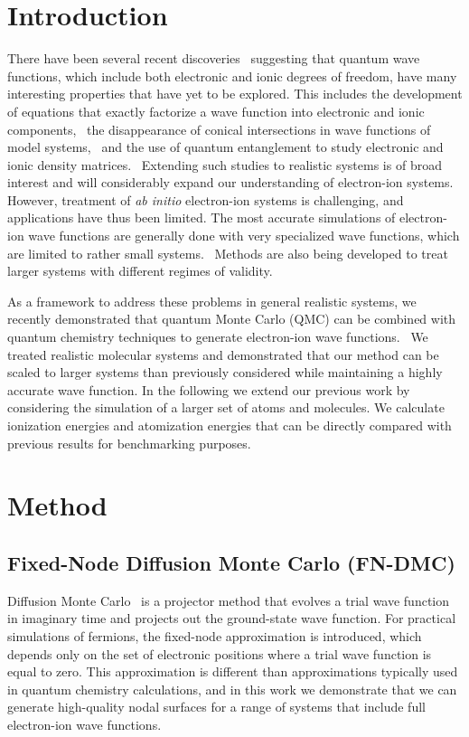 \documentclass[aip,jcp,numerical,reprint]{revtex4-1}
\begin{document}
\section{Introduction}
There have been several recent discoveries~\cite{Tubman_ECG,cederbaum1,gross2014,boent,Martinez_Review} suggesting that quantum wave functions, which include both electronic and ionic degrees of freedom, have many interesting properties that have yet to be explored.  This includes the development of equations that exactly factorize a wave function into electronic and ionic components,~\cite{cederbaum1,cederbaum12} the disappearance of conical intersections in wave functions of model systems,~\cite{gross2014} and the use of quantum entanglement to study electronic and ionic density matrices.~\cite{boent} Extending such studies to realistic systems is of broad interest and will considerably expand our understanding of electron-ion systems. However, treatment of \textit{ab initio} electron-ion systems is challenging, and applications have thus been limited. The most accurate simulations of electron-ion wave functions are generally done with very specialized wave functions, which are limited to rather small systems.~\cite{mitroy2013} Methods are also being developed to treat larger systems with different regimes of validity.~\cite{Sharon_NEO-HF,Sharon_XCNEO-HF1,Sharon_XCNEO-HF2,Sharon_XCNEO-HF,Kurt_XCNEO-HF,Kurt_XCNEO-HF1,Sharon_NEO-DFT,Sharon_NEO-DFT2,Sharon_NEO-DFT3,Gross_NEO-DFT,Gross_NEO-DFT1,Ilkka_Path,Ilkka_Path1,Ilkka_Path2}

As a framework to address these problems in general realistic systems, we recently demonstrated that quantum Monte Carlo (QMC) can be combined with quantum chemistry techniques to generate electron-ion wave functions.~\cite{Tubman_ECG} We treated realistic molecular systems and demonstrated that our method can be scaled to larger systems than previously considered while maintaining a highly accurate wave function. In the following we extend our previous work by considering the simulation of a larger set of atoms and molecules.  We calculate ionization energies and atomization energies that can be directly compared with previous results for benchmarking purposes.

\section{Method}
\subsection{Fixed-Node Diffusion Monte Carlo (FN-DMC)}
Diffusion Monte Carlo~\cite{Anderson_DMC,lester1,Stuart_Review,Needs_Review,Needs_Old_Review,QMC_Review} is a projector method that evolves a trial wave function in imaginary time and projects out the ground-state wave function. For practical simulations of fermions, the fixed-node approximation is introduced, which depends only on the set of electronic positions where a trial wave function is equal to zero.  This approximation is different than approximations typically used in quantum chemistry calculations, and in this work we demonstrate that we can generate high-quality nodal surfaces for a range of systems that include full electron-ion wave functions. 
\end{document}

